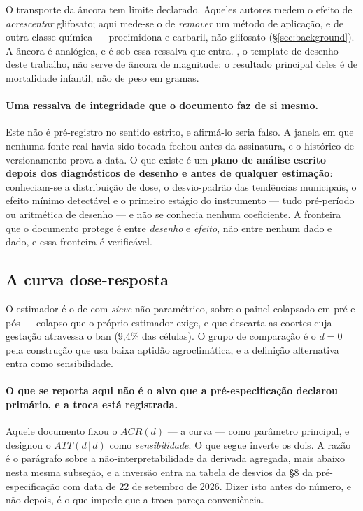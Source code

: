 O transporte da âncora tem limite declarado. Aqueles autores medem o efeito
de \emph{acrescentar} glifosato; aqui mede-se o de \emph{remover} um método de
aplicação, e de outra classe química --- procimidona e carbaril, não glifosato
(§\ref{sec:background}). A âncora é analógica, e é sob essa ressalva que entra.
\citet{dias2023down}, o template de desenho deste trabalho, não serve de âncora
de magnitude: o resultado principal deles é de mortalidade infantil, não de peso
em gramas.

\paragraph{Uma ressalva de integridade que o documento faz de si mesmo.}
Este não é pré-registro no sentido estrito, e afirmá-lo seria falso. A janela em
que nenhuma fonte real havia sido tocada fechou antes da assinatura, e o
histórico de versionamento prova a data. O que existe é um \textbf{plano de
análise escrito depois dos diagnósticos de desenho e antes de qualquer
estimação}: conheciam-se a distribuição de dose, o desvio-padrão das tendências
municipais, o efeito mínimo detectável e o primeiro estágio do instrumento ---
tudo pré-período ou aritmética de desenho --- e não se conhecia nenhum
coeficiente. A fronteira que o documento protege é entre \emph{desenho} e
\emph{efeito}, não entre nenhum dado e dado, e essa fronteira é verificável.

\subsection{A curva dose-resposta}
\label{sub:curva}

O estimador é o de \citet{callaway2024continuous} com \emph{sieve}
não-paramétrico, sobre o painel colapsado em pré e pós --- colapso que o próprio
estimador exige, e que descarta as coortes cuja gestação atravessa o ban
(9,4\% das células). O grupo de comparação é o \(d = 0\) pela construção que
usa baixa aptidão agroclimática, e a definição alternativa entra como
sensibilidade.

\paragraph{O que se reporta aqui não é o alvo que a pré-especificação declarou
primário, e a troca está registrada.}
Aquele documento fixou o \(ACR(d)\) --- a curva --- como parâmetro principal, e
designou o \(ATT(d\,|\,d)\) como \emph{sensibilidade}. O que segue inverte os
dois. A razão é o parágrafo sobre a não-interpretabilidade da derivada agregada,
mais abaixo nesta mesma subseção, e a inversão entra na tabela de desvios da §8
da pré-especificação com data de 22 de setembro de 2026. Dizer isto antes do
número, e não depois, é o que impede que a troca pareça conveniência.

